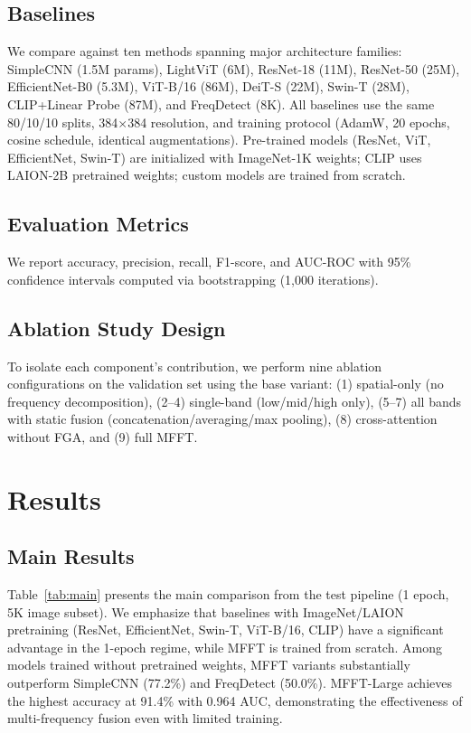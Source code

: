 \documentclass[journal]{IEEEtran}
\begin{document}
\subsection{Baselines}
We compare against ten methods spanning major architecture families: SimpleCNN (1.5M params), LightViT (6M), ResNet-18 (11M), ResNet-50 (25M), EfficientNet-B0 (5.3M), ViT-B/16 (86M), DeiT-S (22M), Swin-T (28M), CLIP+Linear Probe (87M), and FreqDetect (8K). All baselines use the same 80/10/10 splits, 384$\times$384 resolution, and training protocol (AdamW, 20 epochs, cosine schedule, identical augmentations). Pre-trained models (ResNet, ViT, EfficientNet, Swin-T) are initialized with ImageNet-1K weights; CLIP uses LAION-2B pretrained weights; custom models are trained from scratch.

\subsection{Evaluation Metrics}
We report accuracy, precision, recall, F1-score, and AUC-ROC with 95\% confidence intervals computed via bootstrapping (1,000 iterations).

\subsection{Ablation Study Design}
To isolate each component's contribution, we perform nine ablation configurations on the validation set using the base variant: (1) spatial-only (no frequency decomposition), (2--4) single-band (low/mid/high only), (5--7) all bands with static fusion (concatenation/averaging/max pooling), (8) cross-attention without FGA, and (9) full MFFT.

\section{Results}

\subsection{Main Results}
Table~\ref{tab:main} presents the main comparison from the test pipeline (1 epoch, 5K image subset). We emphasize that baselines with ImageNet/LAION pretraining (ResNet, EfficientNet, Swin-T, ViT-B/16, CLIP) have a significant advantage in the 1-epoch regime, while MFFT is trained from scratch. Among models trained without pretrained weights, MFFT variants substantially outperform SimpleCNN (77.2\%) and FreqDetect (50.0\%). MFFT-Large achieves the highest accuracy at 91.4\% with 0.964 AUC, demonstrating the effectiveness of multi-frequency fusion even with limited training.
\end{document}

